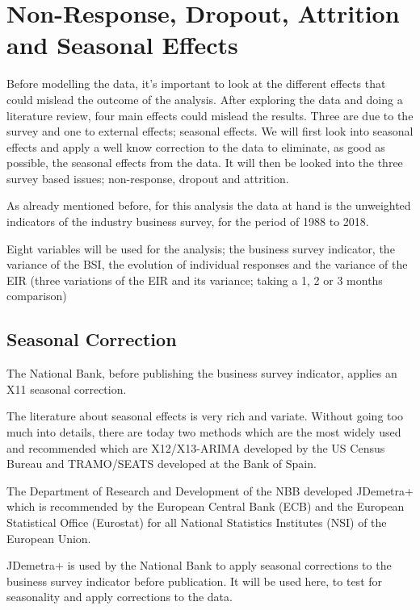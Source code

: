 \documentclass[12pt,a4paper,oneside]{book}
\begin{document}
\chapter{Non-Response, Dropout, Attrition and Seasonal Effects}
\label{chap:nonresponse dropout}

Before modelling the data, it's important to look at the different effects that could mislead the outcome of the analysis. After exploring the data and doing a literature review, four main effects could mislead the results. Three are due to the survey and one to external effects; seasonal effects. We will first look into seasonal effects and apply a well know correction to the data to eliminate, as good as possible, the seasonal effects from the data.
It will then be looked into the three survey based issues; non-response, dropout and attrition.

As already mentioned before, for this analysis the data at hand is the unweighted indicators of the industry business survey, for the period of 1988 to 2018.

Eight variables will be used for the analysis; the business survey indicator, the variance of the BSI, the evolution of individual responses and the variance of the EIR (three variations of the EIR and its variance; taking a 1, 2 or 3 months comparison) 

\section{Seasonal Correction}
\label{sec:seasonal correction}

The National Bank, before publishing the business survey indicator, applies an X11 seasonal correction.

The literature about seasonal effects is very rich and variate. Without going too much into details, there are today two methods which are the most widely used and recommended which are X12/X13-ARIMA developed by the US Census Bureau and TRAMO/SEATS developed at the Bank of Spain. 

The Department of Research and Development of the NBB developed JDemetra+ which is recommended by the European Central Bank (ECB) and the European Statistical Office (Eurostat) for all National Statistics Institutes (NSI) of the European Union. 

JDemetra+ is used by the National Bank to apply seasonal corrections to the business survey indicator before publication. It will be used here, to test for seasonality and apply corrections to the data.
\end{document}
